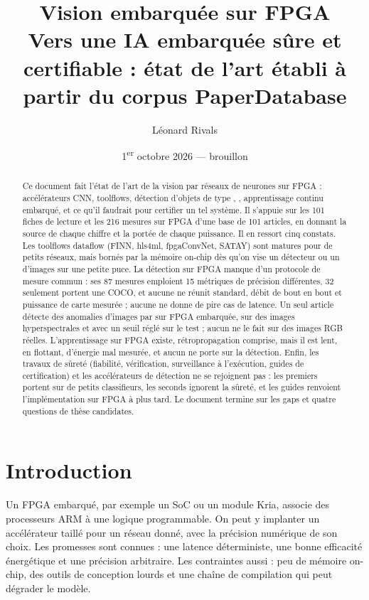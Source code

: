 \documentclass[11pt,a4paper]{article}
\title{\textbf{Vision embarquée sur FPGA}\\[0.3em]
  \large Vers une IA embarquée sûre et certifiable : état de l'art établi à partir du
  corpus PaperDatabase}
\author{Léonard Rivals}
\date{1\textsuperscript{er} octobre 2026 --- brouillon}
\begin{document}
\maketitle

\begin{abstract}
Ce document fait l'état de l'art de la vision par réseaux de neurones sur FPGA :
accélérateurs CNN, toolflows, détection d'objets de type , ,
apprentissage continu embarqué, et ce qu'il faudrait pour certifier un tel système. Il
s'appuie sur les 101 fiches de lecture et les 216 mesures sur FPGA d'une base de 101
articles, en donnant la source de chaque chiffre et la portée de chaque puissance. Il en
ressort cinq constats. Les toolflows dataflow (FINN, hls4ml, fpgaConvNet, SATAY) sont
matures pour de petits réseaux, mais bornés par la mémoire on-chip dès qu'on vise un
détecteur ou un  d'images sur une petite puce. La détection sur FPGA manque
d'un protocole de mesure commun : ses 87 mesures emploient 15 métriques de précision
différentes, 32 seulement portent une  COCO, et aucune ne réunit  standard, débit de
bout en bout et puissance de carte mesurée ; aucune ne donne de pire cas de latence. Un
seul article détecte des anomalies d'images par  sur FPGA embarquée, sur des
images hyperspectrales et avec un seuil réglé sur le test ; aucun ne le fait sur des
images RGB réelles. L'apprentissage sur FPGA existe, rétropropagation comprise, mais il est
lent, en flottant, d'énergie mal mesurée, et aucun ne porte sur la détection. Enfin, les
travaux de sûreté (fiabilité, vérification, surveillance à l'exécution, guides de
certification) et les accélérateurs de détection ne se rejoignent pas : les premiers
portent sur de petits classifieurs, les seconds ignorent la sûreté, et les guides
renvoient l'implémentation sur FPGA à plus tard. Le document termine sur les gaps et
quatre questions de thèse candidates.
\end{abstract}

\tableofcontents

\section{Introduction}

Un FPGA embarqué, par exemple un SoC  ou un module Kria, associe des processeurs ARM à
une logique programmable. On peut y implanter un accélérateur taillé pour un réseau donné,
avec la précision numérique de son choix. Les promesses sont connues : une latence
déterministe, une bonne efficacité énergétique et une précision arbitraire. Les
contraintes aussi : peu de mémoire on-chip, des outils de conception lourds et une chaîne
de compilation qui peut dégrader le modèle.
\end{document}

